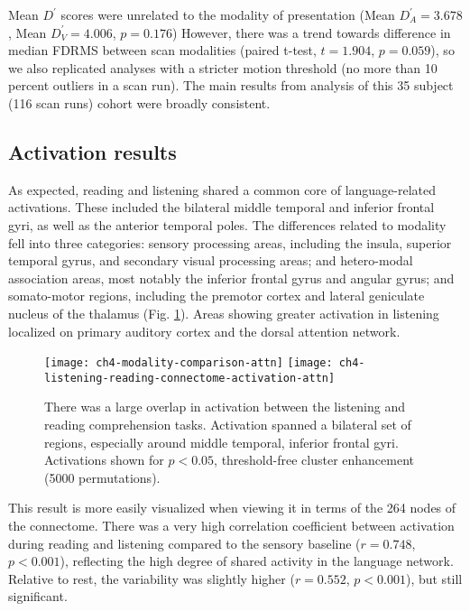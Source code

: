 Mean $D^\prime$ scores were unrelated to the modality of presentation (Mean $D^{\prime}_{A} = 3.678$, Mean $D^{\prime}_{V} = 4.006$, $p = 0.176$) However, there was a trend towards difference in median FDRMS between scan modalities (paired t-test, $t = 1.904$, $p = 0.059$), so we also replicated analyses with a stricter motion threshold (no more than 10 percent outliers in a scan run). The main results from analysis of this 35 subject (116 scan runs) cohort were broadly consistent.

\subsection{Activation results}

As expected, reading and listening shared a common core of language-related activations. These included the bilateral middle temporal and inferior frontal gyri, as well as the  anterior temporal poles. The differences related to modality fell into three categories: sensory processing areas, including the insula, superior temporal gyrus, and secondary visual processing areas; and hetero-modal association areas, most notably the inferior frontal gyrus and angular gyrus; and somato-motor regions, including the premotor cortex and lateral geniculate nucleus of the thalamus (Fig. \ref{fig:ch4-modality-comparison-attn}). Areas showing greater activation in listening localized on primary auditory cortex and the dorsal attention network.

\begin{figure}[t!]
	\centering
	\texttt{[image: ch4-modality-comparison-attn]}
	\texttt{[image: ch4-listening-reading-connectome-activation-attn]}
    \caption[Large overlap between listening and reading activation]{There was a large overlap in activation between the listening and reading comprehension tasks. Activation spanned a bilateral set of regions, especially around middle temporal, inferior frontal gyri. Activations shown for $p < 0.05$, threshold-free cluster enhancement (5000 permutations).}
	\label{fig:ch4-modality-comparison-attn}
\end{figure}

This result is more easily visualized when viewing it in terms of the 264 nodes of the connectome. There was a very high correlation coefficient between activation during reading and listening compared to the sensory baseline ($r = 0.748$, $p < 0.001$), reflecting the high degree of shared activity in the language network. Relative to rest, the variability was slightly higher ($r = 0.552$, $p < 0.001$), but still significant. 

